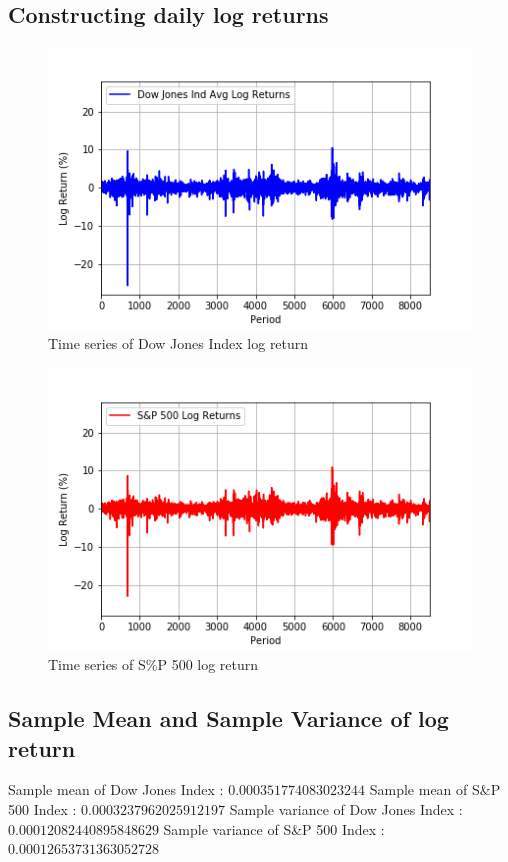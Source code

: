 \documentclass[a4paper]{article}
\begin{document}
\subsection{Constructing daily log returns}
\begin{figure}[h!]
	\includegraphics[width=\linewidth]{DJI_logret.png}
	\caption{Time series of Dow Jones Index log return}
\end{figure}
\begin{figure}[h!]
	\includegraphics[width=\linewidth]{SP_logret.png}
	\caption{Time series of S\%P 500 log return}
\end{figure}

\subsection{Sample Mean and Sample Variance of log return}
\begin{flushleft}
Sample mean of Dow Jones Index : $ 0.000351774083023244 $ \linebreak 
Sample mean of S\&P 500 Index : $ 0.0003237962025912197 $ \linebreak 
Sample variance of Dow Jones Index : $ 0.00012082440895848629 $ \linebreak 
Sample variance of S\&P 500 Index : $ 0.00012653731363052728 $ \linebreak 
\end{flushleft}
\end{document}
